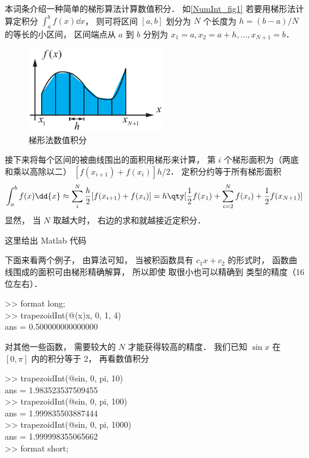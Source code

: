 

本词条介绍一种简单的梯形算法计算数值积分． 如\autoref{NumInt_fig1} 若要用梯形法计算定积分 $\int_a^b f(x) \dd{x}$， 则可将区间 $[a, b]$ 划分为 $N$ 个长度为 $h = (b-a)/N$ 的等长的小区间， 区间端点从 $a$ 到 $b$ 分别为 $x_1 = a, x_2 = a + h, \dots, x_{N+1} = b$．

\begin{figure}[ht]
\centering
\includegraphics[width=6cm]{./figures/NumInt1.pdf}
\caption{梯形法数值积分} \label{NumInt_fig1}
\end{figure}

接下来将每个区间的被曲线围出的面积用梯形来计算， 第 $i$ 个梯形面积为（两底和乘以高除以二）
$[f(x_{i+1}) + f(x_i)]h/2$． 定积分约等于所有梯形面积
\begin{equation}
\int_a^b f(x) \dd{x} \approx \sum_i^N  \frac h2 [f(x_{i+1}) + f(x_i)]
= h\qty[ \frac12 f(x_1) + \sum_{i = 2}^N f(x_i) + \frac12 f(x_{N+1})]
\end{equation}
显然， 当 $N$ 取越大时， 右边的求和就越接近定积分．

这里给出 Matlab 代码

下面来看两个例子， 由算法可知， 当被积函数具有 $c_1 x + c_2$ 的形式时， 函数曲线围成的面积可由梯形精确解算， 所以即使  取很小也可以精确到  类型的精度（16 位左右）．
\begin{Command}
>> format {\color{string}long};\\
>> trapezoidInt(@(x)x, 0, 1, 4)\\
ans = 0.500000000000000
\end{Command}
对其他一些函数， 需要较大的 $N$ 才能获得较高的精度． 我们已知 $\sin x$ 在 $[0, \pi]$ 内的积分等于 $2$， 再看数值积分
\begin{Command}
>> trapezoidInt(@sin, 0, pi, 10)\\
ans = 1.983523537509455\\
>> trapezoidInt(@sin, 0, pi, 100)\\
ans = 1.999835503887444\\
>> trapezoidInt(@sin, 0, pi, 1000)\\
ans = 1.999998355065662\\
>> format {\color{string}short};
\end{Command}
